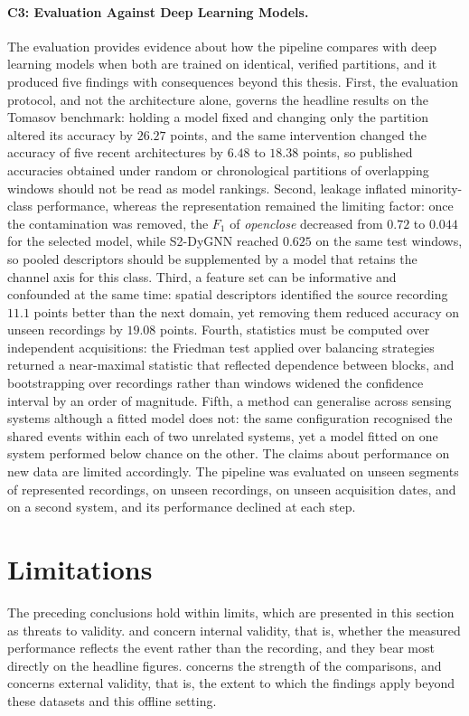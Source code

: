 \paragraph[C3: Evaluation Against Deep Learning Models]{C3: Evaluation Against Deep Learning Models.}
The evaluation provides evidence about how the pipeline compares with deep learning models when both are trained on identical, verified partitions, and it produced five findings with consequences beyond this thesis. First, the evaluation protocol, and not the architecture alone, governs the headline results on the Tomasov benchmark: holding a model fixed and changing only the partition altered its accuracy by $26.27$ points, and the same intervention changed the accuracy of five recent architectures by $6.48$ to $18.38$ points, so published accuracies obtained under random or chronological partitions of overlapping windows should not be read as model rankings. Second, leakage inflated minority-class performance, whereas the representation remained the limiting factor: once the contamination was removed, the $F_1$ of \emph{openclose} decreased from $0.72$ to $0.044$ for the selected model, while S2-DyGNN reached $0.625$ on the same test windows, so pooled descriptors should be supplemented by a model that retains the channel axis for this class. Third, a feature set can be informative and confounded at the same time: spatial descriptors identified the source recording $11.1$ points better than the next domain, yet removing them reduced accuracy on unseen recordings by $19.08$ points. Fourth, statistics must be computed over independent acquisitions: the Friedman test applied over balancing strategies returned a near-maximal statistic that reflected dependence between blocks, and bootstrapping over recordings rather than windows widened the confidence interval by an order of magnitude. Fifth, a method can generalise across sensing systems although a fitted model does not: the same configuration recognised the shared events within each of two unrelated systems, yet a model fitted on one system performed below chance on the other. The claims about performance on new data are limited accordingly. The pipeline was evaluated on unseen segments of represented recordings, on unseen recordings, on unseen acquisition dates, and on a second system, and its performance declined at each step.

\section{Limitations}
\label{sec:chap5Limitations}
The preceding conclusions hold within limits, which are presented in this section as threats to validity.  and  concern internal validity, that is, whether the measured performance reflects the event rather than the recording, and they bear most directly on the headline figures.  concerns the strength of the comparisons, and  concerns external validity, that is, the extent to which the findings apply beyond these datasets and this offline setting.

